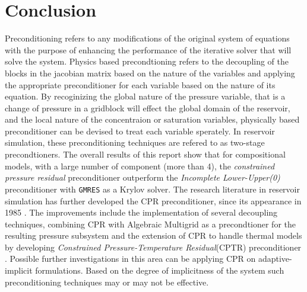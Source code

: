 \chapter{Conclusion}
Preconditioning refers to any modifications of the original system of equations with the purpose of enhancing the performance of
the iterative solver that will solve the system. Physics based precondtioning refers to the decoupling of the blocks in the jacobian
matrix based on the nature of the variables and applying the appropriate preconditioner for each variable based on the nature of its equation.
By recoginizing the global nature of the pressure variable, that is a change of pressure in a gridblock will effect the
global domain of the reservoir, and the local nature of the concentraion or saturation variables, physically based preconditioner can be devised
to treat each variable sperately. In reservoir simulation, these preconditioning techniques are refered to as two-stage precondtioners.
The overall results of this report show that for compositional models, with a large number of component (more than 4), 
the \textit{constrained pressure residual} preconditioner outperform the \textit{Incomplete Lower-Upper(0)} preconditioner 
with \texttt{GMRES} as a Krylov solver. The research literature in reservoir simulation has further developed the CPR preconditioner, 
since its appearance in 1985 \cite{Wallis_1985}. The improvements include the implementation of several decoupling techniques, combining
CPR with Algebraic Multigrid as a precondtioner for the resulting pressure subsystem and the extension of CPR to handle thermal models by
developing \textit{Constrained Pressure-Temperature Residual}(CPTR) preconditioner \cite{cptr}.
Possible further investigations in this area can be applying CPR on adaptive-implicit formulations. Based on the degree of implicitness of the
system such preconditioning techniques may or may not be effective. 
